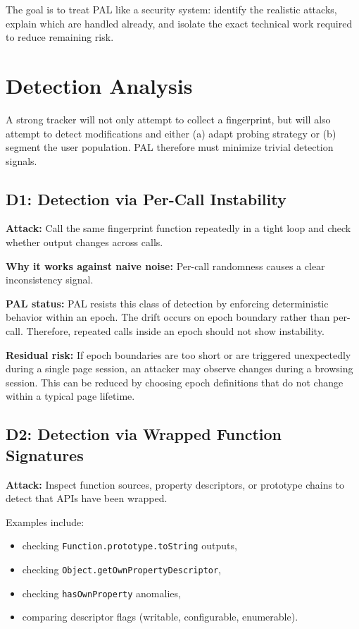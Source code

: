 \documentclass[11pt]{report}
\begin{document}
The goal is to treat PAL like a security system: identify the realistic attacks, explain which are handled already, and isolate the exact technical work required to reduce remaining risk.

\section{Detection Analysis}

A strong tracker will not only attempt to collect a fingerprint, but will also attempt to detect modifications and either (a) adapt probing strategy or (b) segment the user population. PAL therefore must minimize trivial detection signals.

\subsection{D1: Detection via Per-Call Instability}

\textbf{Attack:} Call the same fingerprint function repeatedly in a tight loop and check whether output changes across calls.

\textbf{Why it works against naive noise:} Per-call randomness causes a clear inconsistency signal.

\textbf{PAL status:} PAL resists this class of detection by enforcing deterministic behavior within an epoch. The drift occurs on epoch boundary rather than per-call. Therefore, repeated calls inside an epoch should not show instability.

\textbf{Residual risk:} If epoch boundaries are too short or are triggered unexpectedly during a single page session, an attacker may observe changes during a browsing session. This can be reduced by choosing epoch definitions that do not change within a typical page lifetime.

\subsection{D2: Detection via Wrapped Function Signatures}

\textbf{Attack:} Inspect function sources, property descriptors, or prototype chains to detect that APIs have been wrapped.

Examples include:
\begin{itemize}
    \item checking \texttt{Function.prototype.toString} outputs,
    \item checking \texttt{Object.getOwnPropertyDescriptor},
    \item checking \texttt{hasOwnProperty} anomalies,
    \item comparing descriptor flags (writable, configurable, enumerable).
\end{itemize}
\end{document}
